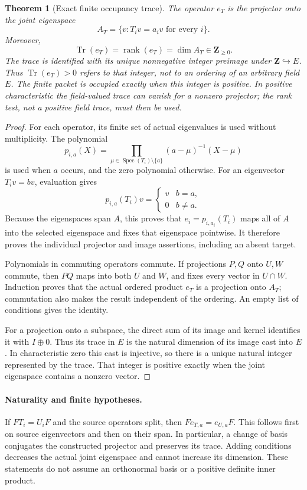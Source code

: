 \documentclass[11pt]{article}
\newtheorem{theorem}{Theorem}[section]
\theoremstyle{definition}
\theoremstyle{remark}
\newcommand{\Z}{\mathbf Z}
\newcommand{\Spec}{\operatorname{Spec}}
\newcommand{\Tr}{\operatorname{Tr}}
\newcommand{\rank}{\operatorname{rank}}
\begin{document}
\begin{theorem}[Exact finite occupancy trace]
The operator \(e_T\) is the projector onto the joint eigenspace
\[
A_T
=
\{v:T_iv=a_iv\text{ for every }i\}.
\]
Moreover,
\[
\boxed{
\Tr(e_T)=\rank(e_T)=\dim A_T\in\Z_{\ge0}.
}
\]
The trace is identified with its unique nonnegative integer preimage under \(\Z\hookrightarrow E\).  Thus \(\Tr(e_T)>0\) refers to that integer, not to an ordering of an arbitrary field \(E\).  The finite packet is occupied exactly when this integer is positive.  In positive characteristic the field-valued trace can vanish for a nonzero projector; the rank test, not a positive field trace, must then be used.
\end{theorem}

\begin{proof}
For each operator, its finite set of actual eigenvalues is used without
multiplicity. The polynomial
\[
 p_{i,a}(X)=\prod_{\mu\in\Spec(T_i)\setminus\{a\}}
 (a-\mu)^{-1}(X-\mu)
\]
is used when $a$ occurs, and the zero polynomial otherwise. For an eigenvector
$T_i v=bv$, evaluation gives
\[
 p_{i,a}(T_i)v=\begin{cases}v&b=a,\\0&b\ne a.\end{cases}
\]
Because the eigenspaces span $A$, this proves that $e_i=p_{i,a_i}(T_i)$ maps
all of $A$ into the selected eigenspace and fixes that eigenspace pointwise.
It therefore proves the individual projector and image assertions, including
an absent target.

Polynomials in commuting operators commute. If projections $P,Q$ onto
$U,W$ commute, then $PQ$ maps into both $U$ and $W$, and fixes every vector
in $U\cap W$. Induction proves that the actual ordered product $e_T$ is a
projection onto $A_T$; commutation also makes the result independent of the
ordering. An empty list of conditions gives the identity.

For a projection onto a subspace, the direct sum of its image and kernel
identifies it with $I\oplus0$. Thus its trace in $E$ is the natural dimension
of its image cast into $E$. In characteristic zero this cast is injective,
so there is a unique natural integer represented by the trace. That integer
is positive exactly when the joint eigenspace contains a nonzero vector.
\end{proof}

\paragraph{Naturality and finite hypotheses.}
If $F T_i=U_i F$ and the source operators split, then
$F e_{T,a}=e_{U,a}F$. This follows first on source eigenvectors and then on
their span. In particular, a change of basis conjugates the constructed
projector and preserves its trace. Adding conditions decreases the actual
joint eigenspace and cannot increase its dimension. These statements do not
assume an orthonormal basis or a positive definite inner product.
\end{document}
